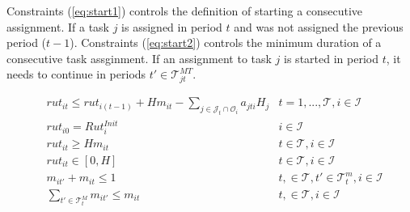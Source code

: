 \documentclass[a4paper,onecolumn,fleqn]{article}
\begin{document}
    Constraints (\ref{eq:start1}) controls the definition of starting a consecutive assignment. If a task $j$ is assigned in period $t$ and was not assigned the previous period ($t-1$).
    Constraints (\ref{eq:start2}) controls the minimum duration of a consecutive task assginment. If an assignment to task $j$ is started in period $t$, it needs to continue in periods $t' \in \mathcal{T}^{MT}_{jt}$.

    \begin{align}
         & rut_{it} \leq rut_{i(t-1)} + H m_{it} - \sum_{j \in \mathcal{J}_t \cap \mathcal{O}_i} a_{jti} H_j & t =1, ..., \mathcal{T}, i \in \mathcal{I} \label{eq:rut_upper}\\
        & rut_{i0} = Rut^{Init}_i
               & i \in \mathcal{I} \label{eq:rut_initial}\\
        & rut_{it} \geq H m_{it}
                & t \in \mathcal{T}, i \in \mathcal{I}\label{eq:rut_lower}\\ 
        & rut_{it} \in [0,H]
                & t \in \mathcal{T}, i \in \mathcal{I} \label{eq:mu} \\               
        & m_{it'} + m_{it} \leq 1
          & t, \in \mathcal{T}, t' \in \mathcal{T}^{m}_t, i \in \mathcal{I}\label{eq:ret_min}\\ 
        & \sum_{t' \in \mathcal{T}^{M}_t} m_{it'} \leq  m_{it}
          & t, \in \mathcal{T}, i \in \mathcal{I}\label{eq:ret_max}
    \end{align}

\end{document}
